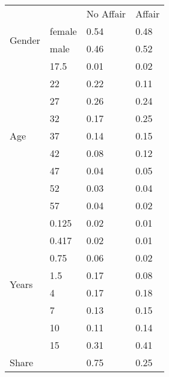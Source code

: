 \begin{table}[ht]
\centering
\begin{tabular}{llll}
  \toprule 
 & & No Affair & Affair \\ 
 \multirow{2}{*}{Gender} & female & 0.54 & 0.48 \\ 
     & male & 0.46 & 0.52 \\ 
  \multirow{9}{*}{Age} & 17.5 & 0.01 & 0.02 \\ 
    & 22 & 0.22 & 0.11 \\ 
    & 27 & 0.26 & 0.24 \\ 
    & 32 & 0.17 & 0.25 \\ 
    & 37 & 0.14 & 0.15 \\ 
    & 42 & 0.08 & 0.12 \\ 
    & 47 & 0.04 & 0.05 \\ 
    & 52 & 0.03 & 0.04 \\ 
    & 57 & 0.04 & 0.02 \\ 
  \multirow{8}{*}{Years} & 0.125 & 0.02 & 0.01 \\ 
   Married  & 0.417 & 0.02 & 0.01 \\ 
    & 0.75 & 0.06 & 0.02 \\ 
    & 1.5 & 0.17 & 0.08 \\ 
    & 4 & 0.17 & 0.18 \\ 
    & 7 & 0.13 & 0.15 \\ 
    & 10 & 0.11 & 0.14 \\ 
    & 15 & 0.31 & 0.41 \\ 
  Share &  & 0.75 & 0.25 \\ 
   \bottomrule 
\end{tabular}
\end{table}
